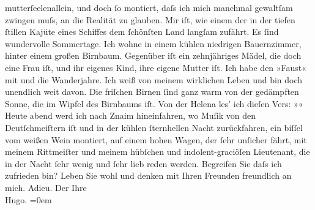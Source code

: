 \begin{ledgroupsized}[t]{13cm}
               mutterſeelenallein, und {\pb}doch ſo
               montiert, daſs ich mich manchmal gewaltſam zwingen muſs, an die Realität zu glauben.
               Mir iſt, wie einem der in der tiefen ſtillen Kajüte eines Schiffes dem ſchönſten Land
               langſam zufährt.\pend
           \pstart
           Es ſind wundervolle Sommertage. Ich wohne in einem kühlen niedrigen Bauernzimmer,
               hinter einem großen Birnbaum. Gegenüber iſt ein zehnjähriges Mädel, die doch eine
               Frau iſt, und ihr eigenes Kind, ihre eigene Mutter iſt. Ich habe den »Faust« mit und die Wanderjahre. Ich weiß von meinem {\pb}wirklichen Leben und bin doch
               unendlich weit davon.\pend
           \pstart
           Die friſchen Birnen ſind ganz warm von der gedämpften Sonne, die im Wipfel des
               Birnbaums iſt. Von der Helena les’ ich dieſen
               Vers: »\label{K_L00476-2v}\label{K_L00476-2h}« Heute abend werd ich nach Znaim hineinfahren, wo Muſik von den Deutſchmeiſtern iſt und in der kühlen ſternhellen Nacht zurückfahren, ein
               biſſel vom weißen Wein montiert, auf einem hohen Wagen, der ſehr {\pb}unſicher fährt, mit meinem
               Rittmeiſter und meinem hübſchen und indolent-graciöſen Lieutenant, die in der Nacht
               ſehr wenig und ſehr lieb reden werden. Begreifen Sie daſs ich zufrieden bin?\pend
           \pstart
           Leben Sie wohl und denken mit Ihren Freunden freundlich an mich. Adieu.\pend
           \pstart
           Der Ihre{\\[\baselineskip]}\spacefill\mbox{Hugo.}\pend
           \leftskip=0em{}
         
         \endnumbering{}\end{ledgroupsized}  \newcommand{\dateiname}{L00476}\newcommand{\titel}{Hugo von Hofmannsthal an Arthur Schnitzler, 21. [8. 1895]}\newcommand{\editorInnen}{Martin Anton Müller und Gerd-Hermann Susen}
      